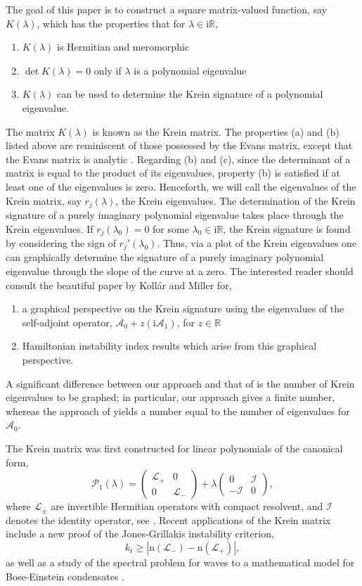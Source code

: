 \documentclass[review,onefignum,onetabnum]{siamart171218}
\newcommand{\R}{\mathbb{R}}
\def\det{\mathop\mathrm{det}\nolimits}
\newcommand{\rmi}{\mathrm{i}}
\newcommand{\rmn}{\mathrm{n}}
\newcommand{\rmr}{\mathrm{r}}
\newcommand{\calA}{\mathcal{A}}
\newcommand{\calI}{\mathcal{I}}
\newcommand{\calL}{\mathcal{L}}
\newcommand{\calP}{\mathcal{P}}
\newcommand{\vK}{\bm{\mathit{K}}}
\begin{document}
The goal of this paper is to construct a square matrix-valued function, say
$\vK(\lambda)$, which has the properties that for
$\lambda\in\rmi\R$,
\begin{enumerate}
\item $\vK(\lambda)$ is Hermitian and meromorphic
\item $\det\vK(\lambda)=0$ only if $\lambda$ is a polynomial eigenvalue
\item $\vK(\lambda)$ can be used to determine the Krein signature of a
    polynomial eigenvalue.
\end{enumerate}
The matrix $\vK(\lambda)$ is known as the Krein matrix. The properties (a) and (b) listed
above are reminiscent of those possessed by the Evans matrix, except that
the Evans matrix is analytic \cite[Chapters~8-10]{kapitula:sad13}. Regarding (b) and (c), since the determinant of a matrix is equal to the product of its eigenvalues, property (b) is satisfied if at least one of the eigenvalues is zero. Henceforth, we will call the eigenvalues of the Krein matrix, say $r_j(\lambda)$, the Krein eigenvalues. The determination of the Krein signature of a purely imaginary polynomial
eigenvalue takes place through the Krein eigenvalues.
If $r_j(\lambda_0)=0$ for some $\lambda_0\in\rmi\R$, the Krein
signature is found by considering the sign of $r_j'(\lambda_0)$. Thus, via a plot of the Krein eigenvalues one can graphically determine the signature of a purely imaginary polynomial eigenvalue through the slope of the curve at a zero. The interested reader should consult the beautiful paper by Koll\'ar and Miller \cite{kollar:gks14} for,
\begin{enumerate}
\item a graphical perspective on the Krein signature using the eigenvalues of the self-adjoint operator, $\calA_0+z(\rmi\calA_1)$, for $z\in\R$
\item Hamiltonian instability index results which arise from this graphical perspective.
\end{enumerate}
A significant difference between our approach and that of \cite{kollar:gks14} is the number of Krein eigenvalues to be graphed; in particular, our approach gives a finite number, whereas the approach of \cite{kollar:gks14} yields a number equal to the number of eigenvalues for $\calA_0$.

The Krein matrix was first constructed for linear
polynomials of the canonical form,
\[
\calP_1(\lambda)=\left(\begin{array}{cc}\calL_+&0\\0&\calL_-\end{array}\right)
+\lambda\left(\begin{array}{rr}0&\calI\\-\calI&0\end{array}\right),
\]
where $\calL_\pm$ are invertible Hermitian operators with compact resolvent, and $\calI$ denotes the identity operator,
see \cite{kapitula:tks10,li:sso98}.
Recent applications of the Krein matrix include a new proof of the
Jones-Grillakis instability criterion,
\[
k_\rmr\ge|\rmn(\calL_-)-\rmn(\calL_+)|,
\]
as well as a study of the spectral problem for waves to a mathematical model
for Bose-Einstein condensates \cite{kapitula:tkm13,kapitula:sif12}.
\end{document}
